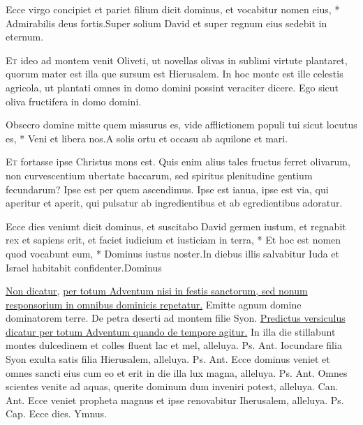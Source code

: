 \begin{multicols*}{2}
\begin{responsory}
{Ecce virgo concipiet et pariet filium dicit dominus, et vocabitur nomen eius, * Admirabilis deus fortis.}{Super solium David et super regnum eius sedebit in eternum.}
\end{responsory}
\lettrine[lines=2]{\zallmancaps \color{Blue} E}{t} ideo ad montem venit Oliveti, ut novellas olivas in sublimi virtute plantaret, quorum mater est illa que sursum est Hierusalem. In hoc monte est ille celestis agricola, ut plantati omnes in domo domini possint veraciter dicere. Ego sicut oliva fructifera in domo domini.
\begin{responsory}
{Obsecro domine mitte quem missurus es, vide afflictionem populi tui sicut locutus es, * Veni et libera nos.}{A solis ortu et occasu ab aquilone et mari.}
\end{responsory}
\lettrine[lines=2]{\zallmancaps \color{Red} E}{t} fortasse ipse Christus mons est. Quis enim alius tales fructus ferret olivarum, non curvescentium ubertate baccarum, sed spiritus plenitudine gentium fecundarum? Ipse est per quem ascendimus. Ipse est ianua, ipse est via, qui aperitur et aperit, qui pulsatur ab ingredientibus et ab egredientibus adoratur.
\begin{responsory-final}
{Ecce dies veniunt dicit dominus, et suscitabo David germen iustum, et regnabit rex et sapiens erit, et faciet iudicium et iusticiam in terra, * Et hoc est nomen quod vocabunt eum, * Dominus iustus noster.}{In diebus illis salvabitur Iuda et Israel habitabit confidenter.}{Dominus}
\end{responsory-final}
\newline \ul{Non dicatur,}  \ul{per totum Adventum nisi in festis sanctorum, sed nonum responsorium in omnibus dominicis repetatur.}
\newline \V Emitte agnum domine dominatorem terre.
\newline \R De petra deserti ad montem filie Syon.
\newline \ul{Predictus versiculus dicatur per totum Adventum quando de tempore agitur.}
 In illa die stillabunt montes dulcedinem et colles fluent lac et mel, alleluya. {\color{Red} Ps.}  {\color{Red} Ant.} Iocundare filia Syon exulta satis filia Hierusalem, alleluya. {\color{Red} Ps.}  {\color{Red} Ant.} Ecce dominus veniet et omnes sancti eius cum eo et erit in die illa lux magna, alleluya. {\color{Red} Ps.}  {\color{Red} Ant.} Omnes scientes venite ad aquas, querite dominum dum inveniri potest, alleluya. {\color{Red} Can.}  {\color{Red} Ant.} Ecce veniet propheta magnus et ipse renovabitur Iherusalem, alleluya. {\color{Red} Ps.}  {\color{Red} Cap.} Ecce dies. {\color{Red} Ymnus.}

\end{multicols*}
